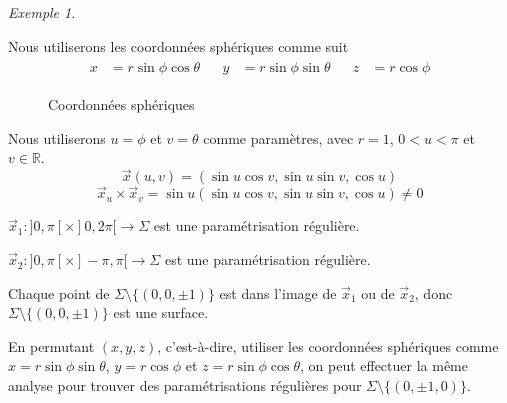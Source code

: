 \documentclass{report}
\theoremstyle{definition}
\theoremstyle{remark}
\newtheorem*{exem}{Exemple}
\def\RR{\mathbb{R}}
\begin{document}
\begin{exem}
\begin{enumerate}
			Nous utiliserons les coordonn\'ees sph\'eriques comme suit
			\begin{align*}
				\begin{split}
					x&= r\sin\phi\cos\theta
				\end{split}
				&
				\begin{split}
					y&= r\sin\phi\sin\theta
				\end{split}
				&
				\begin{split}
					z&= r\cos\phi
				\end{split}
			\end{align*}
			\begin{figure}[h]
				\centering
				\caption{Coordonn\'ees sph\'eriques}
			\end{figure}

			Nous utiliserons $u=\phi$ et $v=\theta$ comme param\`etres, avec $r=1$, $0<u<\pi$ et $v\in\RR$.
			\[ \vec x(u,v) = (\sin u\cos v, \sin u\sin v, \cos u) \] \[ \vec x_u\times\vec x_v = \sin u(\sin u\cos v, \sin u\sin v, \cos u) \neq 0 \]

			$\vec x_1:]0,\pi[\times]0,2\pi[\to\Sigma$ est une param\'etrisation r\'eguli\`ere.

			$\vec x_2:]0,\pi[\times]-\pi,\pi[\to\Sigma$ est une param\'etrisation r\'eguli\`ere.

			Chaque point de $\Sigma\setminus\{(0,0,\pm1)\}$ est dans l'image de $\vec x_1$ ou de $\vec x_2$, donc $\Sigma\setminus\{(0,0,\pm1)\}$ est une surface.

			En permutant $(x,y,z)$, c'est-\`a-dire, utiliser les coordonn\'ees sph\'eriques comme $x=r\sin\phi\sin\theta$, $y=r\cos\phi$ et $z=r\sin\phi\cos\theta$, on peut effectuer la m\^eme analyse pour trouver des param\'etrisations r\'eguli\`eres pour $\Sigma\setminus\{(0,\pm1,0)\}$.


\end{enumerate}
\end{exem}
\end{document}
